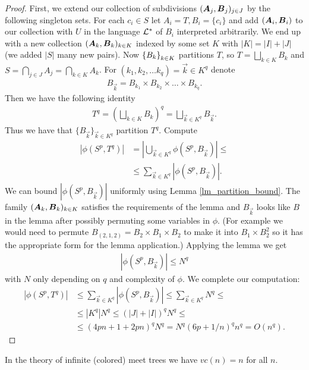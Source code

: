 \begin{proof}
  First, we extend our collection of subdivisions $(\operatorname{\boldsymbol A}_j, \operatorname{\boldsymbol B}_j)_{j \in J}$ by the following singleton sets.
  For each $c_i \in S$ let $A_i = T, B_i = \{c_i\}$ and add $(\operatorname{\boldsymbol A}_i, \operatorname{\boldsymbol B}_i)$ to our collection with $U$ in the language $\mathcal L^*$ of $B_i$ interpreted arbitrarily.
  We end up with a new collection $(\operatorname{\boldsymbol A}_k, \operatorname{\boldsymbol B}_k)_{k \in K}$ indexed by some set $K$ with $|K| = |I| + |J|$ (we added $|S|$ many new pairs). Now $\left\{B_k\right\}_{k \in K}$ partitions $T$, so $T = \bigsqcup_{k \in K} B_k$ and $S = \bigcap_{j \in J} A_j = \bigcap_{k \in K} A_k$. For $(k_1, k_2, \ldots k_q) = \vec k \in K^q$ denote 
  \begin{align*}
    B_{\vec k} = B_{k_1} \times B_{k_2} \times \ldots \times B_{k_q}.
  \end{align*}
  Then we have the following identity
  \begin{align*}
    T^q = (\bigsqcup_{k \in K} B_k)^q = \bigsqcup_{\vec k \in K^q} B_{\vec k}.
  \end{align*}
  Thus we have that $\{B_{\vec k}\}_{\vec k \in K^q}$ partition $T^q$. Compute
  \begin{align*}
    |\phi(S^p, T^q)|
    &= \left|\bigcup_{\vec k \in K^q} \phi(S^p, B_{\vec k}) \right| \leq \\
    &\leq \sum_{\vec k \in K^q} |\phi(S^p, B_{\vec k})|.
  \end{align*}
  We can bound $|\phi(S^p, B_{\vec k})|$ uniformly using Lemma \ref{lm_partition_bound}. The family $(\operatorname{\boldsymbol A}_k, \operatorname{\boldsymbol B}_k)_{k \in K}$ satisfies the requirements of the lemma and $B_{\vec k}$ looks like $B$ in the lemma after possibly permuting some variables in $\phi$.
  (For example we would need to permute $B_{(2,1,2)} = B_2 \times B_1 \times B_2$ to make it into $B_1 \times B_2^2$ so it has the appropriate form for the lemma application.)
  Applying the lemma we get
  \begin{align*}
    |\phi(S^p, B_{\vec k})| \leq N^q
  \end{align*}
  with $N$ only depending on $q$ and complexity of $\phi$. We complete our computation:
  \begin{align*}
    |\phi(S^p, T^q)|
    &\leq \sum_{\vec k \in K^q} |\phi(S^p, B_{\vec k})| \leq \sum_{\vec k \in K^q} N^q \leq \\
    &\leq |K^q| N^q \leq (|J| + |I|)^q N^q \leq \\
    &\leq (4pn + 1 + 2pn)^q N^q = N^q (6p + 1/n)^q n^q = O(n^q).
  \end{align*}
\end{proof}
\begin{Corollary}
  In the theory of infinite (colored) meet trees we have $vc(n) = n$ for all $n$.
\end{Corollary}
